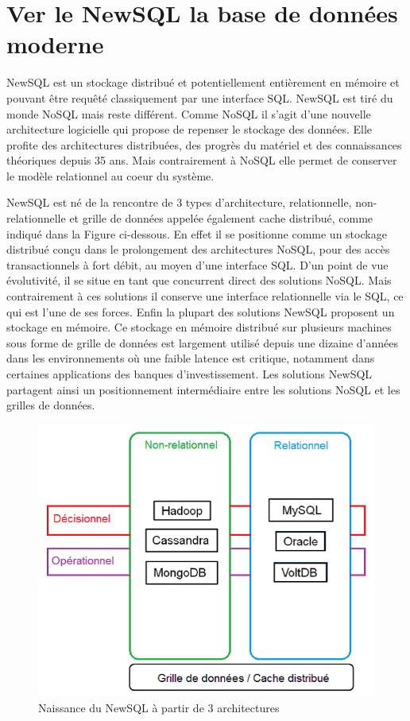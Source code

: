 \section{Ver le NewSQL la base de données moderne}
NewSQL est un stockage distribué et potentiellement entièrement en mémoire et pouvant être requêté classiquement par une interface SQL. NewSQL est tiré du monde NoSQL mais reste différent. Comme NoSQL il s’agit d’une nouvelle architecture logicielle qui propose de repenser le stockage des données. Elle profite des architectures distribuées, des progrès du matériel et des connaissances théoriques depuis 35 ans. Mais contrairement à NoSQL elle permet de conserver le modèle relationnel au coeur du système.

NewSQL est né de la rencontre de 3 types d’architecture, relationnelle, non-relationnelle et grille de données appelée également cache distribué, comme indiqué dans la Figure ci-dessous. En effet il se positionne comme un stockage distribué conçu dans le prolongement des architectures NoSQL, pour des accès transactionnels à fort débit, au moyen d’une interface SQL. D’un point de vue évolutivité, il se situe en tant que concurrent direct des solutions NoSQL. Mais contrairement à ces solutions il conserve une interface relationnelle via le SQL, ce qui est l’une de ses forces. Enfin la plupart des solutions NewSQL proposent un stockage en mémoire. Ce stockage en mémoire distribué sur plusieurs machines sous forme de grille de données est largement utilisé depuis une dizaine d’années dans les environnements où une faible latence est critique, notamment dans certaines applications des banques d’investissement. Les solutions NewSQL partagent ainsi un positionnement intermédiaire entre les solutions NoSQL et les grilles de données.

\begin{figure}[h]
	\centering
    \includegraphics[scale=0.5]{img/4.13}
    \caption{Naissance du NewSQL à partir de 3 architectures}
\end{figure}
\newpage
